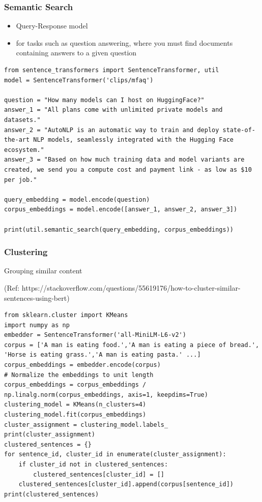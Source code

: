 \begin{frame}[fragile]\frametitle{Semantic Search}

\begin{itemize}
\item Query-Response model
\item for tasks such as question answering, where you must find documents containing answers to a given question
\end{itemize}


\begin{lstlisting}
from sentence_transformers import SentenceTransformer, util
model = SentenceTransformer('clips/mfaq')

question = "How many models can I host on HuggingFace?"
answer_1 = "All plans come with unlimited private models and datasets."
answer_2 = "AutoNLP is an automatic way to train and deploy state-of-the-art NLP models, seamlessly integrated with the Hugging Face ecosystem."
answer_3 = "Based on how much training data and model variants are created, we send you a compute cost and payment link - as low as $10 per job."

query_embedding = model.encode(question)
corpus_embeddings = model.encode([answer_1, answer_2, answer_3])

print(util.semantic_search(query_embedding, corpus_embeddings))
\end{lstlisting}

\end{frame}

\begin{frame}[fragile]\frametitle{Clustering}

Grouping similar content

{\tiny (Ref: https://stackoverflow.com/questions/55619176/how-to-cluster-similar-sentences-using-bert)}

\begin{lstlisting}
from sklearn.cluster import KMeans
import numpy as np
embedder = SentenceTransformer('all-MiniLM-L6-v2')
corpus = ['A man is eating food.','A man is eating a piece of bread.', 'Horse is eating grass.','A man is eating pasta.' ...]
corpus_embeddings = embedder.encode(corpus)
# Normalize the embeddings to unit length
corpus_embeddings = corpus_embeddings /  np.linalg.norm(corpus_embeddings, axis=1, keepdims=True)
clustering_model = KMeans(n_clusters=4)
clustering_model.fit(corpus_embeddings)
cluster_assignment = clustering_model.labels_
print(cluster_assignment)
clustered_sentences = {}
for sentence_id, cluster_id in enumerate(cluster_assignment):
    if cluster_id not in clustered_sentences:
        clustered_sentences[cluster_id] = []
    clustered_sentences[cluster_id].append(corpus[sentence_id])
print(clustered_sentences)
\end{lstlisting}

\end{frame}


